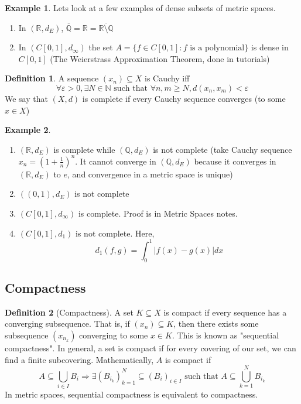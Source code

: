\documentclass[11pt,a4paper]{article}
\theoremstyle{definition}
\newtheorem{definition}{Definition}[section]
\newtheorem{example}{Example}[section]
\begin{document}
\begin{example} Lets look at a few examples of dense subsets of metric spaces.
    \begin{enumerate}
        \item In $(\mathbb{R}, d_E)$, $\overline{\mathbb{Q}} = \mathbb{R} = \overline{\mathbb{R} \setminus \mathbb{Q}}$
        \item In $(C[0,1], d_\infty )$ the set $A = \{f \in C[0,1]: f \text{ is a polynomial}\}$ is dense in $C[0,1]$ (The Weierstrass Approximation Theorem, done in tutorials)
    \end{enumerate}
\end{example}

\begin{definition}
    A sequence $(x_n) \subseteq X$ is Cauchy iff \[\forall \varepsilon>0, \exists N \in \mathbb{N} \text{ such that } \forall n,m\ge N, d(x_n, x_m) < \varepsilon\]We say that $(X,d)$ is complete if every Cauchy sequence converges (to some $x\in X$)
\end{definition}

\begin{example} $ $
    \begin{enumerate}
        \item $(\mathbb{R}, d_E)$ is complete while $(\mathbb{Q}, d_E)$ is not complete (take Cauchy sequence $x_n = (1+\frac{1}{n})^n$. It cannot converge in $(\mathbb{Q}, d_E)$ because it converges in $(\mathbb{R}, d_E)$ to $e$, and convergence in a metric space is unique)
        \item $((0,1), d_E)$ is not complete
        \item $(C[0,1], d_\infty)$ is complete. Proof is in Metric Spaces notes.
        \item $(C[0,1], d_1)$ is not complete. Here, \[
        d_1(f,g) = \int _0^1 |f(x) - g(x)|dx
        \]
    \end{enumerate}
\end{example}

\subsection*{Compactness}

\begin{definition}[Compactness]
    A set $K \subseteq X$ is compact if every sequence has a converging subsequence. That is, if $(x_n) \subseteq K$, then there exists some subsequence $(x_{n_k})$ converging to some $x\in K$. This is known as "sequential compactness". In general, a set is compact if for every covering of our set, we can find a finite subcovering. Mathematically, $A$ is compact if \[A \subseteq \bigcup \limits _{i \in I}B_i \Rightarrow \exists (B_{i_k})_{k=1}^N \subseteq (B_i)_{i \in I}\text{ such that } A \subseteq \bigcup \limits _{k=1}^N B_{i_k}\]
    In metric spaces, sequential compactness is equivalent to compactness.
\end{definition}
\end{document}
